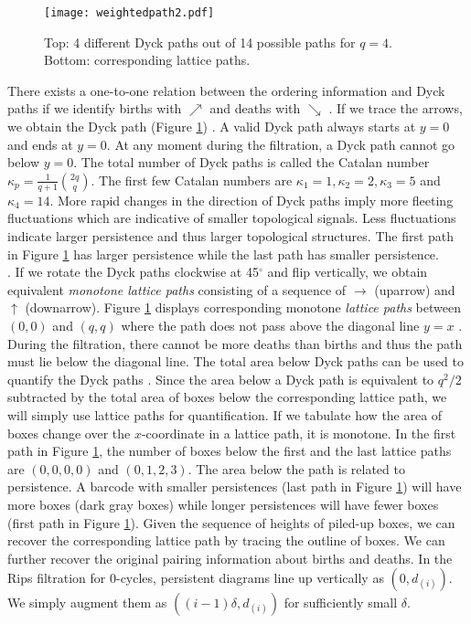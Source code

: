 \documentclass{llncs}
\begin{document}
 \begin{figure}[t]
\center
  \texttt{[image: weightedpath2.pdf]}
  \caption{\small Top: 4 different Dyck paths out of 14 possible paths for $q=4$. Bottom: corresponding lattice paths.}
  \label{fig:latticepath}
\end{figure}

There exists a one-to-one relation between the ordering information and Dyck paths if we identify births with $ \nearrow$ and deaths with $\searrow$ \cite{billera.2001,simion.2000}. If we trace the arrows, we obtain the Dyck path (Figure \ref{fig:latticepath}) \cite{stanley.1999}.  A valid Dyck path always starts at $y=0$ and ends at $y=0$. At any moment during the filtration, a Dyck path cannot go below $y=0$. The total number of Dyck paths 
is called the Catalan number $\kappa_p = \frac{1}{q+1} {2q \choose q}$. The first few Catalan numbers 
are $\kappa_1 = 1, \kappa_2 =2, \kappa_3 = 5$ and $\kappa_4 = 14$.  
More rapid changes in the direction of Dyck paths imply more fleeting fluctuations which are indicative of smaller topological signals. 
Less fluctuations indicate larger persistence and thus larger topological structures. The first path in Figure \ref{fig:latticepath} has larger 
persistence while the last path has smaller persistence. \\

. If we rotate the Dyck paths clockwise at 45$^{\circ}$ and flip vertically, we obtain equivalent {\em monotone lattice paths} consisting of a sequence of $\rightarrow$ (uparrow) and $\uparrow$ (downarrow). Figure \ref{fig:latticepath} displays corresponding monotone {\em lattice paths} between $(0,0)$ and $(q,q)$  where the path does not pass above the diagonal line $y=x$ \cite{stanley.1999}. During the filtration, there cannot be more deaths than births and thus the path must lie below the diagonal line. The total area below Dyck paths can be used to quantify the Dyck paths  \cite{chapman.1999}. Since the area below a Dyck path is equivalent to  $q^2/2$ subtracted by the total area of boxes below the corresponding lattice path,
we will simply use lattice paths for quantification. If we tabulate how the area of boxes change over the $x$-coordinate in a lattice path, it is monotone. In the first path in  Figure \ref{fig:latticepath}, the number of boxes below the first and the last lattice paths are $(0,0,0,0)$ and $(0,1,2,3)$. The area below the path is related to persistence. A barcode with smaller persistences (last path in Figure \ref{fig:latticepath}) will have more boxes (dark gray boxes) while longer persistences will have fewer boxes (first path in Figure \ref{fig:latticepath}). Given the sequence of heights of piled-up boxes, we can recover the corresponding lattice path by tracing the outline of boxes. We can further recover the original pairing information about births and deaths. In the Rips filtration for 0-cycles, persistent diagrams line up vertically as $(0, d_{(i)})$. We simply augment them as $ ( (i-1) \delta, d_{(i)})$ for sufficiently small $\delta$.
\end{document}
